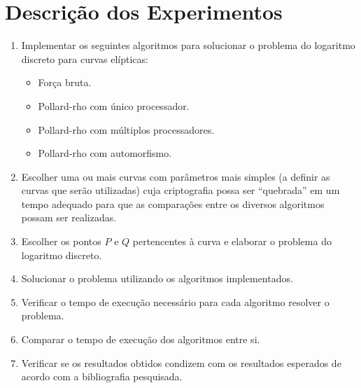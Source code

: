 \chapter{Descrição dos Experimentos}

\begin{enumerate}

\item Implementar os seguintes algoritmos para solucionar o problema do logaritmo discreto para curvas elípticas:
  \begin{itemize}
  \item Força bruta.
  \item Pollard-rho com único processador.
  \item Pollard-rho com múltiplos processadores.
  \item Pollard-rho com automorfismo.
  \end{itemize}
\item Escolher uma ou mais curvas com parâmetros mais simples (a definir as curvas que serão utilizadas) cuja criptografia possa ser ``quebrada'' em um tempo adequado para que as comparações entre os diversos algoritmos possam ser realizadas.
\item Escolher os pontos \(P\) e \(Q\) pertencentes à curva e elaborar o problema do logaritmo discreto.
\item Solucionar o problema utilizando os algoritmos implementados.
\item Verificar o tempo de execução necessário para cada algoritmo resolver o problema.
\item Comparar o tempo de execução dos algoritmos entre si.
\item Verificar se os resultados obtidos condizem com os resultados esperados de acordo com a bibliografia pesquisada.

\end{enumerate}
